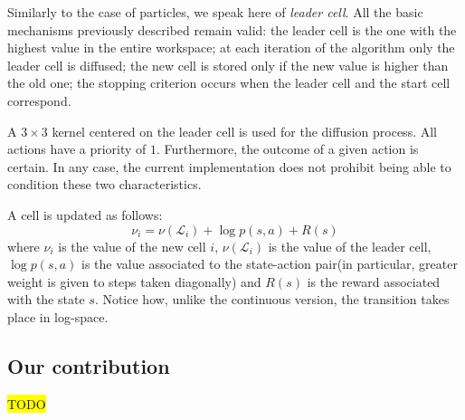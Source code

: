 \documentclass[journal,article,submit,pdftex,moreauthors]{Definitions/mdpi}
\begin{document}
Similarly to the case of particles, we speak here of \textit {leader cell}. All the basic mechanisms previously described remain valid: the leader cell is the one with the highest value in the entire workspace; at each iteration of the algorithm only the leader cell is diffused; the new cell is stored only if the new value is higher than the old one; the stopping criterion occurs when the leader cell and the start cell correspond.

A $3 \times 3$ kernel centered on the leader cell is used for the diffusion process. All actions have a priority of $1$. Furthermore, the outcome of a given action is certain. In any case, the current implementation does not prohibit being able to condition these two characteristics.

A cell is updated as follows:
\begin{equation*}\label{eq:weight_update_disc}
    \nu_i = \nu(\mathcal{L}_i) + \log p(s,a) + R(s)
\end{equation*}
where $\nu_i$ is the value  of the new cell $i$, $\nu(\mathcal{L}_i)$ is the value of the leader cell, $\log p(s,a)$ is the value associated to the state-action pair(in particular, greater weight is given to steps taken diagonally) and $R(s)$ is the reward associated with the state $s$. Notice how, unlike the continuous version, the transition takes place in log-space.


\subsection{Our contribution}
\colorbox{yellow}{TODO}
\end{document}
